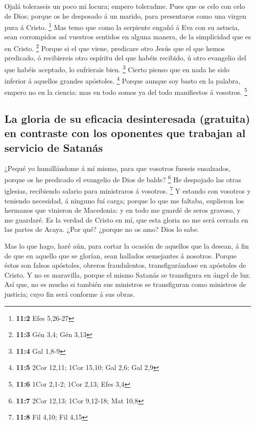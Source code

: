  Ojalá toleraseis un poco mi locura; empero toleradme.
 Pues que os celo con celo de Dios; porque os he desposado á
un marido, para presentaros como una virgen pura á Cristo. \footnote{\textbf{11:2}
  Efes 5,26-27}  Mas temo que como la serpiente engañó á Eva
con su astucia, sean corrompidos así vuestros sentidos en alguna manera,
de la simplicidad que es en Cristo. \footnote{\textbf{11:3} Gén 3,4; Gén
  3,13}  Porque si el que viene, predicare otro Jesús que el
que hemos predicado, ó recibiereis otro espíritu del que habéis
recibido, ú otro evangelio del que habéis aceptado, lo sufrierais bien.
\footnote{\textbf{11:4} Gal 1,8-9}  Cierto pienso que en
nada he sido inferior á aquellos grandes apóstoles. \footnote{\textbf{11:5}
  2Cor 12,11; 1Cor 15,10; Gal 2,6; Gal 2,9}  Porque aunque
soy basto en la palabra, empero no en la ciencia: mas en todo somos ya
del todo manifiestos á vosotros. \footnote{\textbf{11:6} 1Cor 2,1-2;
  1Cor 2,13; Efes 3,4}

\hypertarget{la-gloria-de-su-eficacia-desinteresada-gratuita-en-contraste-con-los-oponentes-que-trabajan-al-servicio-de-satanuxe1s}{%
\subsection{La gloria de su eficacia desinteresada (gratuita) en
contraste con los oponentes que trabajan al servicio de
Satanás}\label{la-gloria-de-su-eficacia-desinteresada-gratuita-en-contraste-con-los-oponentes-que-trabajan-al-servicio-de-satanuxe1s}}

 ¿Pequé yo humillándome á mí mismo, para que vosotros
fueseis ensalzados, porque os he predicado el evangelio de Dios de
balde? \footnote{\textbf{11:7} 2Cor 12,13; 1Cor 9,12-18; Mat 10,8}
 He despojado las otras iglesias, recibiendo salario para
ministraros á vosotros. \footnote{\textbf{11:8} Fil 4,10; Fil 4,15}
 Y estando con vosotros y teniendo necesidad, á ninguno fuí
carga; porque lo que me faltaba, suplieron los hermanos que vinieron de
Macedonia: y en todo me guardé de seros gravoso, y me guardaré.
 Es la verdad de Cristo en mí, que esta gloria no me será
cerrada en las partes de Acaya.  ¿Por qué? ¿porque no os
amo? Dios lo sabe.

 Mas lo que hago, haré aún, para cortar la ocasión de
aquellos que la desean, á fin de que en aquello que se glorían, sean
hallados semejantes á nosotros.  Porque éstos son falsos
apóstoles, obreros fraudulentos, transfigurándose en apóstoles de
Cristo.  Y no es maravilla, porque el mismo Satanás se
transfigura en ángel de luz.  Así que, no es mucho si
también sus ministros se transfiguran como ministros de justicia; cuyo
fin será conforme á sus obras.


